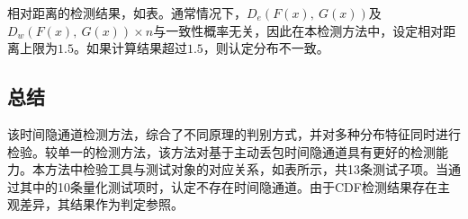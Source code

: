 
相对距离的检测结果，如表。通常情况下，$D_{e}(F(x),\ G(x))$及$D_{w}(F(x),\ G(x))\times n$与一致性概率无关，因此在本检测方法中，设定相对距离上限为$1.5$。如果计算结果超过$1.5$，则认定分布不一致。

\subsection{总结}
\label{chap:analyze:statistical:sum}
该时间隐通道检测方法，综合了不同原理的判别方式，并对多种分布特征同时进行检验。较单一的检测方法，该方法对基于主动丢包时间隐通道具有更好的检测能力。本方法中检验工具与测试对象的对应关系，如表所示，共13条测试子项。当通过其中的10条量化测试项时，认定不存在时间隐通道。由于CDF检测结果存在主观差异，其结果作为判定参照。

